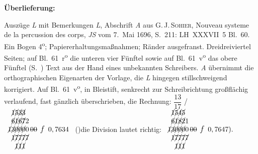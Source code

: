 %  
%
%
%
%   
%
%
%
%
%
%
\frenchspacing
%
\begin{ledgroupsized}[r]{120mm}
\footnotesize
\pstart
\noindent\textbf{Überlieferung:}
\pend
\end{ledgroupsized}
%
\begin{ledgroupsized}[r]{114mm}
\footnotesize
\pstart \parindent -7mm
%
Auszüge \textit{L} mit Bemerkungen \textit{L}, Abschrift \textit{A}
aus \protect{}G.\,J.\,\textsc{Sohier}, 
\cite{00526}\glqq Nouveau systeme de la percussion des corps\grqq,
\cite{00157}\textit{JS} vom 7.~Mai 1696, S.~211:
LH~XXXVII~5 Bl.~60.
Ein Bogen 4\textsuperscript{o};
Papiererhaltungsmaßnahmen;
Ränder ausgefranst.
Dreidreiviertel Seiten;
auf Bl.~61~r\textsuperscript{o}
die unteren vier Fünftel
sowie auf Bl.~61~v\textsuperscript{o}
das obere Fünftel (S.~)
Text aus der Hand eines unbekannten Schreibers.
\textit{A} übernimmt die orthographischen Eigenarten der Vorlage, die \textit{L} hingegen stillschweigend korrigiert.
Auf Bl.~61~v\textsuperscript{o}, in Bleistift, senkrecht zur Schreibrichtung großflächig verlaufend, fast gänzlich überschrieben, die Rechnung:
\pend
\vspace{0.2em}
%
\pstart\noindent
$\dfrac{13}{17}$ \quad \lbrack/\rbrack\ 
$\begin{array}{lllllll}
\phantom{1}\cancel{1}\cancel{5}\cancel{3}\cancel{3}
&
\\
\phantom{1}\cancel{6}\cancel{1}\cancel{6}\cancel{7}2
&
\\
\cancel{1}\cancel{3}\cancel{0}\cancel{0}\cancel{0}0\,\text{\sout{00}}
&
\hspace{-0.5em}
\text{\large \textit{f}}\ \, 0,7634
\\
\phantom{1}\cancel{1}\cancel{7}\cancel{7}\cancel{7}\cancel{7}
&
\\
\phantom{1}\phantom{1}\cancel{1}\cancel{1}\cancel{1}
\end{array}$
%
(\protect\vphantom)die Division lautet richtig: 
%
$\begin{array}{lllllll}
\phantom{1}\cancel{1}\cancel{5}\cancel{4}\cancel{5}
&
\\
\phantom{1}\cancel{6}\cancel{1}\cancel{8}\cancel{2}1
&
\\
\cancel{1}\cancel{3}\cancel{0}\cancel{0}\cancel{0}0\,\text{\sout{00}}
&
\hspace{-0.5em}
\text{\large \textit{f}}\ \, 0,7647%
\protect\vphantom().
\\
\phantom{1}\cancel{1}\cancel{7}\cancel{7}\cancel{7}\cancel{7}
&
\\
\phantom{1}\phantom{1}\cancel{1}\cancel{1}\cancel{1}
\end{array}$
\pend
%
\end{ledgroupsized}
